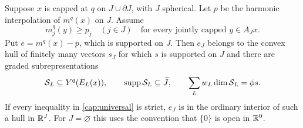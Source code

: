 \begin{proposition}
\label{cap:hull}
Suppose $x$ is capped at $q$ on $J\cup\partial J$, with $J$ spherical.
Let $p$ be the harmonic interpolation of $m^q(x)$ on $J$.  Assume
\begin{equation}
 m_j^q(y)\ge p_j\quad(j\in J)
 \quad\text{for every jointly capped }y\in A_Jx.
 \label{cap:universal}
\end{equation}
Put $e=m^q(x)-p$, which is supported on $J$. Then $e_J$ belongs to
the convex hull of finitely many
vectors $s_J$ for which $s$ is supported on $J$ and there are graded
subrepresentations
\begin{equation}
 \mathcal S_L\subseteq Y^q(E_L(x)),\qquad
 \operatorname{supp}\mathcal S_L\subseteq\widetilde J,\qquad
 \sum_Lw_L\dim\mathcal S_L=\phi s.
 \label{cap:subobjects}
\end{equation}
If every inequality in \eqref{cap:universal} is strict, $e_J$ is in
the ordinary interior of such a hull in $\mathbb R^J$.  For $J=\varnothing$
this uses the convention that $\{0\}$ is open in $\mathbb R^0$.
\end{proposition}
